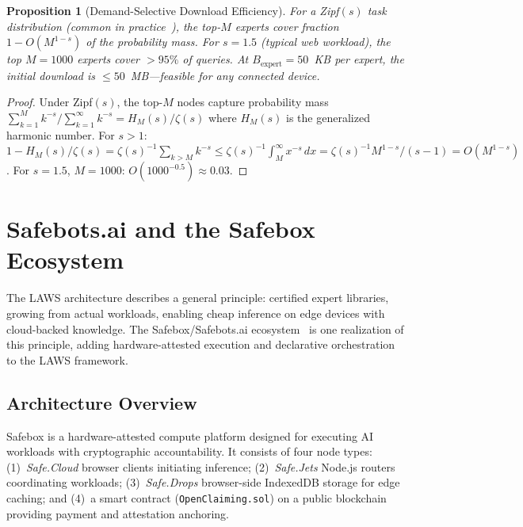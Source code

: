 \documentclass[11pt]{article}
\newtheorem{proposition}{Proposition}
\begin{document}
\begin{proposition}[Demand-Selective Download Efficiency]
\label{prop:demand}
For a Zipf$(s)$ task distribution (common in practice~\cite{zipf1949}),
the top-$M$ experts cover fraction $1 - O(M^{1-s})$ of the probability mass.
For $s = 1.5$ (typical web workload), the top $M = 1000$ experts cover
$> 95\%$ of queries.  At $B_{\mathrm{expert}} = 50$~KB per expert, the
initial download is $\leq 50$~MB---feasible for any connected device.
\end{proposition}

\begin{proof}
Under Zipf$(s)$, the top-$M$ nodes capture probability mass
$\sum_{k=1}^M k^{-s} / \sum_{k=1}^\infty k^{-s} = H_M(s)/\zeta(s)$
where $H_M(s)$ is the generalized harmonic number.  For $s > 1$:
$1 - H_M(s)/\zeta(s) = \zeta(s)^{-1}\sum_{k>M} k^{-s}
\leq \zeta(s)^{-1} \int_M^\infty x^{-s}\,dx = \zeta(s)^{-1} M^{1-s}/(s-1)
= O(M^{1-s})$.  For $s=1.5$, $M=1000$: $O(1000^{-0.5}) \approx 0.03$.
\end{proof}

\section{Safebots.ai and the Safebox Ecosystem}
\label{sec:safebox}

The LAWS architecture describes a general principle: certified expert libraries,
growing from actual workloads, enabling cheap inference on edge devices with
cloud-backed knowledge.  The Safebox/Safebots.ai
ecosystem~\cite{safebots,safebox_protocol} is one realization of this principle,
adding hardware-attested execution and declarative orchestration to the LAWS
framework.

\subsection{Architecture Overview}

Safebox is a hardware-attested compute platform designed for executing AI
workloads with cryptographic accountability.  It consists of four node types:
(1)~\emph{Safe.Cloud} browser clients initiating inference; (2)~\emph{Safe.Jets}
Node.js routers coordinating workloads; (3)~\emph{Safe.Drops} browser-side
IndexedDB storage for edge caching; and (4)~a smart contract
(\texttt{OpenClaiming.sol}) on a public blockchain providing payment and
attestation anchoring.
\end{document}
